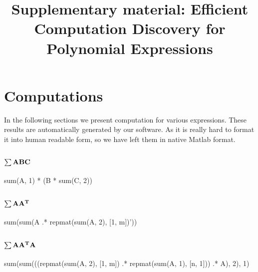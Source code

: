 \documentclass[]{article}
\title{Supplementary material: Efficient Computation Discovery for Polynomial Expressions}
\begin{document}
 

\maketitle

\section{Computations}

In the following sections we present computation for various expressions.
These results are automatically generated by our software.
As it is really hard to format it into human readable form, so we have left them in native Matlab format. 

\subsection{{$\bf \sum ABC$}}
sum(A, 1) * (B * sum(C, 2))

\subsection{{$\bf \sum AA^T$}}
sum(sum(A .* repmat(sum(A, 2), [1, m])'))

\subsection{{$\bf \sum AA^TA$}}
sum(sum(((repmat(sum(A, 2), [1, m]) .* repmat(sum(A, 1), [n, 1])) .* A), 2), 1) 
\end{document}
